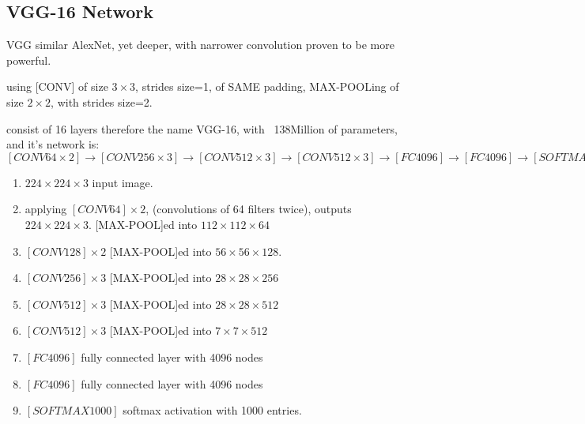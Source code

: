 \documentclass[4apaper,12pt]{book}
\begin{document}
  \subsection{VGG-16 Network}
  \begin{description}
  \item VGG similar AlexNet, yet deeper, with narrower convolution proven to be more powerful.
  \item using [CONV] of size $3\times{3}$, strides size=1, of SAME padding, MAX-POOLing of size $2\times{2}$, with strides size=2.
  \item consist of 16 layers therefore the name VGG-16, with ~138Million of parameters, and it's network is:  $[CONV64\times{2}] \rightarrow [CONV256\times{3}] \rightarrow [CONV512\times{3}] \rightarrow [CONV512\times{3}] \rightarrow [FC4096] \rightarrow [FC4096] \rightarrow [SOFTMAX1000]$
    \end{description}
  \begin{enumerate}
  \item  $224\times{224}\times{3}$ input image.
  \item  applying $[CONV64] \times{2}$, (convolutions of 64 filters twice), outputs $224\times{224}\times{3}$. [MAX-POOL]ed into $112\times{112}\times{64}$
  \item  $[CONV128]\times{2}$ [MAX-POOL]ed into $56\times{56}\times{128}$.
  \item  $[CONV256]\times{3}$ [MAX-POOL]ed into $28\times{28}\times{256}$
  \item  $[CONV512]\times{3}$ [MAX-POOL]ed into $28\times{28}\times{512}$
  \item  $[CONV512]\times{3}$ [MAX-POOL]ed into $7\times{7}\times{512}$
  \item $[FC4096]$ fully connected layer with  4096 nodes
  \item $[FC4096]$ fully connected layer with  4096 nodes
  \item $[SOFTMAX1000]$  softmax activation with 1000 entries.
  \end{enumerate}
\end{document}
